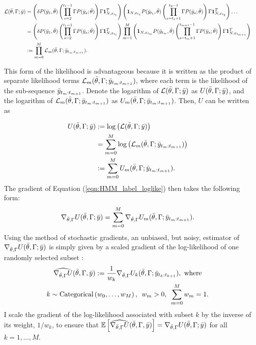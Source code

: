 \begin{align}
    \mathcal{L}(\bar{\theta},\Gamma;\bar{y}) &= \left(\delta P(\bar{y}_1,\bar{\theta}) \left(\prod_{s=2}^{t_1-1} \Gamma P(\bar{y}_s;\bar{\theta})\right) \Gamma \mathbf{1}^T_{N,x_{t_1}}\right) \left(\mathbf{1}_{N,x_{t_1}} P(\bar{y}_{t_1},\bar{\theta}) \left(\prod_{s=t_1+1}^{t_2-1} \Gamma P(\bar{y}_s;\bar{\theta})\right) \Gamma \mathbf{1}^T_{N,x_{t_2}}\right) \ldots \nonumber \\
    &= \left(\delta P(\bar{y}_1,\bar{\theta}) \left(\prod_{s=2}^{t_1-1} \Gamma P(\bar{y}_s;\bar{\theta})\right) \Gamma \mathbf{1}_{N,x_{t_1}}^T\right) \prod_{m=1}^{M} \left( \mathbf{1}_{N,x_{t_m}} P(\bar{y}_{t_m},\bar{\theta}) \left(\prod_{s=t_m+1}^{t_{m+1}-1} \Gamma P(\bar{y}_s;\bar{\theta})\right) \Gamma \mathbf{1}_{N,x_{t_{m+1}}}^T\right)  \nonumber \\
    &:= \prod_{m=0}^{M} \mathcal{L}_m(\bar{\theta},\Gamma;\bar{y}_{t_m:t_{m+1}}).
    \label{eqn:HMM_label_like}
\end{align}

This form of the likelihood is advantageous because it is written as the product of separate likelihood terms $\mathcal{L}_m(\bar{\theta},\Gamma;\bar{y}_{t_m:t_{m+1}})$, where each term is the likelihood of the sub-sequence $\bar{y}_{t_m:t_{m+1}}$. Denote the logarithm of $\mathcal{L}(\bar{\theta},\Gamma;\bar{y})$ as $U(\bar{\theta},\Gamma;\bar{y})$, and the logarithm of $\mathcal{L}_m(\bar{\theta},\Gamma;\bar{y}_{t_m:t_{m+1}})$ as $U_m(\bar{\theta},\Gamma;\bar{y}_{t_m:t_{m+1}})$. Then, $U$ can be written as

\begin{align}
    U(\bar{\theta},\Gamma;\bar{y}) &:= \log\left(\mathcal{L}(\bar{\theta},\Gamma;\bar{y})\right) \nonumber \\
    &= \sum_{m=0}^M \log \left(\mathcal{L}_m(\bar{\theta},\Gamma;\bar{y}_{t_m:t_{m+1}})\right) \nonumber \\
    & := \sum_{m=0}^M U_m(\bar{\theta},\Gamma;\bar{y}_{t_m:t_{m+1}}).
    \label{eqn:HMM_label_loglike}
\end{align}
%
The gradient of Equation (\ref{eqn:HMM_label_loglike}) then takes the following form:
%
\begin{equation}
    \nabla_{\bar{\theta},\Gamma} U(\bar{\theta},\Gamma;\bar{y}) = \sum_{m=0}^M \nabla_{\bar{\theta},\Gamma} U_m(\bar{\theta},\Gamma;\bar{y}_{t_m:t_{m+1}}).
    \label{eqn:grad_HMM_label_loglike}
\end{equation}
%
Using the method of stochastic gradients, an unbiased, but noisy, estimator of $\nabla_{\bar{\theta},\Gamma} U(\bar{\theta},\Gamma;\bar{y})$ is simply given by a scaled gradient of the log-likelihood of one randomly selected subset \citep{Robbins:1951}:
%
\begin{gather}
    \widehat{\nabla_{\bar{\theta},\Gamma} U}(\bar{\theta},\Gamma,\bar{y}) := \frac{1}{w_k} \nabla_{\bar{\theta},\Gamma} U_k(\bar{\theta},\Gamma;\bar{y}_{t_k:t_{k+1}}) \label{eqn:SGD_estimate}, \text{ where} \\
    k \sim \text{Categorical}\left(w_0,\ldots,w_M\right), \enspace w_m > 0, \enspace \sum_{m=0}^M w_m = 1. \nonumber
\end{gather}
%
I scale the gradient of the log-likelihood associated with subset $k$ by the inverse of its weight, $1/w_k$, to ensure that $\mathbb{E}\left[\widehat{\nabla_{\bar{\theta},\Gamma} U}(\bar{\theta},\Gamma,\bar{y})\right] = \nabla_{\bar{\theta},\Gamma} U(\bar{\theta},\Gamma;\bar{y})$ for all $k = 1,\ldots,M$. 

